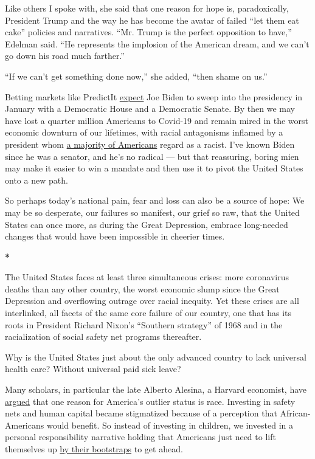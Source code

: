 Like others I spoke with, she said that one reason for hope is,
paradoxically, President Trump and the way he has become the avatar of
failed ``let them eat cake'' policies and narratives. ``Mr. Trump is the
perfect opposition to have,'' Edelman said. ``He represents the
implosion of the American dream, and we can't go down his road much
farther.''

``If we can't get something done now,'' she added, ``then shame on us.''

Betting markets like PredictIt
\href{https://www.predictit.org/markets/2/Congress}{expect} Joe Biden to
sweep into the presidency in January with a Democratic House and a
Democratic Senate. By then we may have lost a quarter million Americans
to Covid-19 and remain mired in the worst economic downturn of our
lifetimes, with racial antagonisms inflamed by a president whom
\href{https://news.yahoo.com/new-yahoo-news-you-gov-poll-most-americans-say-trump-is-a-racist-and-want-him-to-stop-tweeting-160841770.html}{a
majority of Americans} regard as a racist. I've known Biden since he was
a senator, and he's no radical --- but that reassuring, boring mien may
make it easier to win a mandate and then use it to pivot the United
States onto a new path.

So perhaps today's national pain, fear and loss can also be a source of
hope: We may be so desperate, our failures so manifest, our grief so
raw, that the United States can once more, as during the Great
Depression, embrace long-needed changes that would have been impossible
in cheerier times.

\textbf{*}

The United States faces at least three simultaneous crises: more
coronavirus deaths than any other country, the worst economic slump
since the Great Depression and overflowing outrage over racial inequity.
Yet these crises are all interlinked, all facets of the same core
failure of our country, one that has its roots in President Richard
Nixon's ``Southern strategy'' of 1968 and in the racialization of social
safety net programs thereafter.

Why is the United States just about the only advanced country to lack
universal health care? Without universal paid sick leave?

Many scholars, in particular the late Alberto Alesina, a Harvard
economist, have
\href{https://scholar.harvard.edu/files/glaeser/files/why_doesnt_the_u.s._have_a_european-style_welfare_state.pdf}{argued}
that one reason for America's outlier status is race. Investing in
safety nets and human capital became stigmatized because of a perception
that African-Americans would benefit. So instead of investing in
children, we invested in a personal responsibility narrative holding
that Americans just need to lift themselves up
\href{https://www.nytimes.com/2020/02/19/opinion/economic-mobility.html}{by
their bootstraps} to get ahead.

